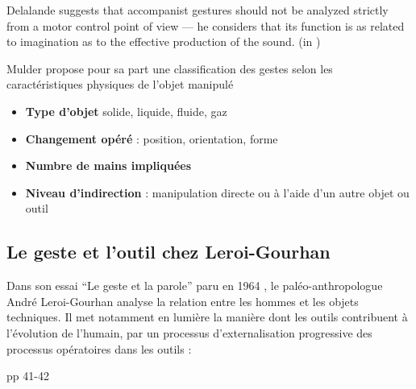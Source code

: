  \cite{wanderley_controle_1999}

Delalande suggests that accompanist gestures should not be analyzed strictly from a motor control point of view — he considers that its function is as related to imagination as to the effective production of the sound. (in \cite{cadoz_gesture_2000})

Mulder \cite{mulder_mulder_2000} propose pour sa part une classification des gestes selon les caractéristiques physiques de l'objet manipulé
\vspace{-1em}
\begin{itemize}[noitemsep]
\item \textbf{Type d'objet} solide, liquide, fluide, gaz
\item \textbf{Changement opéré} : position, orientation, forme
\item \textbf{Numbre de mains impliquées}
\item \textbf{Niveau d'indirection} : manipulation directe ou à l'aide d'un autre objet ou outil
\end{itemize}



\subsection{Le geste et l'outil chez Leroi-Gourhan}
Dans son essai ``Le geste et la parole'' paru en 1964 \cite{leroi-gourhan_geste_1964}, le paléo-anthropologue André Leroi-Gourhan analyse la relation entre les hommes et les objets techniques. Il met notamment en lumière la manière dont les outils contribuent à l'évolution de l'humain, par un processus d'externalisation progressive des processus opératoires dans les outils :

\cite{leroi-gourhan_geste_2013-1} pp 41-42


